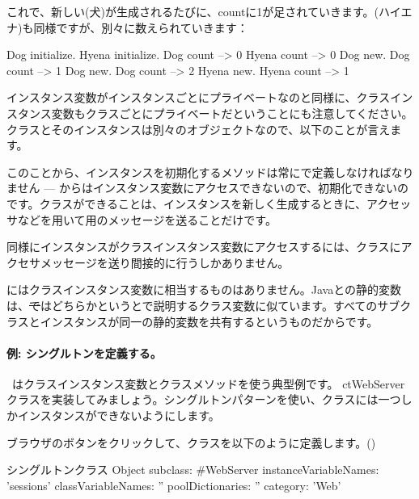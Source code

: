 \documentclass[a4paper,10pt,twoside]{book}
\begin{document}
これで、新しい(犬)が生成されるたびに、countに1が足されていきます。(ハイエナ)も同様ですが、別々に数えられていきます：
\begin{code}{}
Dog initialize.
Hyena initialize.
Dog count     --> 0
Hyena count --> 0
Dog new.
Dog count     --> 1
Dog new.
Dog count     --> 2
Hyena new.
Hyena count --> 1
\end{code}

インスタンス変数がインスタンスごとにプライベートなのと同様に、クラスインスタンス変数もクラスごとにプライベートだということにも注意してください。クラスとそのインスタンスは別々のオブジェクトなので、以下のことが言えます。

このことから、インスタンスを初期化するメソッドは常にで定義しなければなりません --- からはインスタンス変数にアクセスできないので、初期化できないのです。クラスができることは、インスタンスを新しく生成するときに、アクセッサなどを用いて用のメッセージを送ることだけです。

同様にインスタンスがクラスインスタンス変数にアクセスするには、クラスにアクセサメッセージを送り間接的に行うしかありません。

にはクラスインスタンス変数に相当するものはありません。Javaとの静的変数は、\st ではどちらかというとで説明するクラス変数に似ています。すべてのサブクラスとインスタンスが同一の静的変数を共有するというものだからです。

\paragraph{例: シングルトンを定義する。}
~\cite{Alpe98a}はクラスインスタンス変数とクラスメソッドを使う典型例です。 ct{WebServer}クラスを実装してみましょう。シングルトンパターンを使い、クラスには一つしかインスタンスができないようにします。

ブラウザのボタンをクリックして、クラスを以下のように定義します。()

\begin{classdef}[singleton]{シングルトンクラス}
Object subclass: #WebServer
	instanceVariableNames: 'sessions' 	
	classVariableNames: '' 	
	poolDictionaries: '' 	
	category: 'Web'
\end{classdef}
\end{document}
